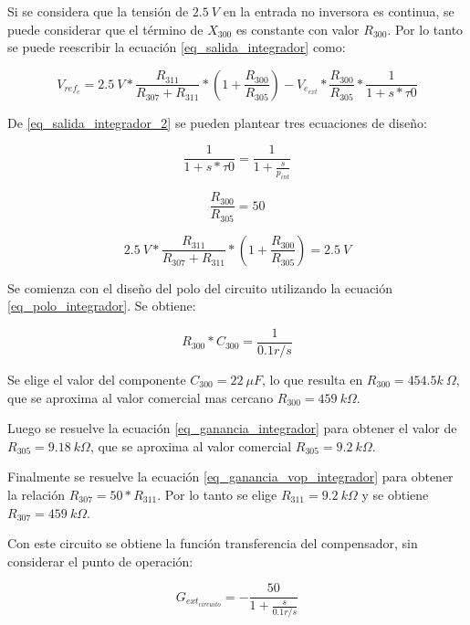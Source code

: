 Si se considera que la tensión de $2.5\:V$ en la entrada no inversora es continua, se puede considerar que el término de $X_{300}$ es constante con valor $R_{300}$. Por lo tanto se puede reescribir la ecuación \ref{eq_salida_integrador} como:

\begin{equation} \label{eq_salida_integrador_2}
	V_{ref_c}=2.5\:V*\frac{R_{311}}{R_{307}+R_{311}}*(1+\frac{R_{300}}{R_{305}})-V_{e_{ext}}*\frac{R_{300}}{R_{305}}*\frac{1}{1+s*\tau 0}
\end{equation}

De \ref{eq_salida_integrador_2} se pueden plantear tres ecuaciones de diseño:

\begin{equation} \label{eq_polo_integrador}
	\frac{1}{1+s*\tau 0}=\frac{1}{1+\frac{s}{p_{int}}}
\end{equation}

\begin{equation} \label{eq_ganancia_integrador}
	\frac{R_{300}}{R_{305}}=50
\end{equation}


\begin{equation} \label{eq_ganancia_vop_integrador}
	2.5\:V*\frac{R_{311}}{R_{307}+R_{311}}*(1+\frac{R_{300}}{R_{305}})=2.5\:V
\end{equation}

Se comienza con el diseño del polo del circuito utilizando la ecuación \ref{eq_polo_integrador}. Se obtiene:

\begin{equation}
	R_{300}*C_{300}=\frac{1}{0.1r/s}
\end{equation}

Se elige el valor del componente $C_{300}=22\:\mu F$, lo que resulta en $R_{300}=454.5k\:\Omega$, que se aproxima al valor comercial mas cercano $R_{300}=459\:k\Omega$.

Luego se resuelve la ecuación \ref{eq_ganancia_integrador} para obtener el valor de $R_{305}=9.18\:k\Omega$, que se aproxima al valor comercial $R_{305}=9.2\:k\Omega$.

Finalmente se resuelve la ecuación \ref{eq_ganancia_vop_integrador} para obtener la relación $R_{307}=50*R_{311}$. Por lo tanto se elige $R_{311}=9.2\:k\Omega$ y se obtiene $R_{307}=459\:k\Omega$.


Con este circuito se obtiene la función transferencia del compensador, sin considerar el punto de operación:

\begin{equation} \label{eq_gexterno_circuito}
	G_{ext_{circuito}}=-\frac{50}{1+\frac{s}{0.1r/s}}
\end{equation}

